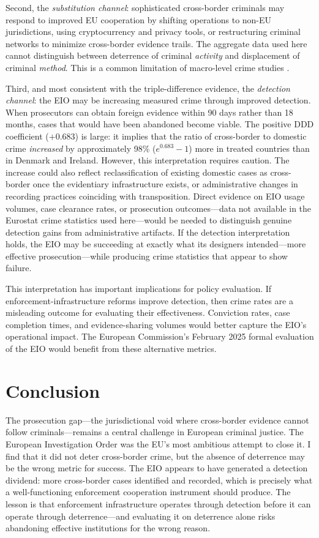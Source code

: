 \documentclass[12pt]{article}
\begin{document}
Second, the \textit{substitution channel}: sophisticated cross-border criminals may respond to improved EU cooperation by shifting operations to non-EU jurisdictions, using cryptocurrency and privacy tools, or restructuring criminal networks to minimize cross-border evidence trails. The aggregate data used here cannot distinguish between deterrence of criminal \textit{activity} and displacement of criminal \textit{method}. This is a common limitation of macro-level crime studies \citep{draca2011panic}.

Third, and most consistent with the triple-difference evidence, the \textit{detection channel}: the EIO may be increasing measured crime through improved detection. When prosecutors can obtain foreign evidence within 90 days rather than 18 months, cases that would have been abandoned become viable. The positive DDD coefficient ($+0.683$) is large: it implies that the ratio of cross-border to domestic crime \textit{increased} by approximately 98\% ($e^{0.683} - 1$) more in treated countries than in Denmark and Ireland. However, this interpretation requires caution. The increase could also reflect reclassification of existing domestic cases as cross-border once the evidentiary infrastructure exists, or administrative changes in recording practices coinciding with transposition. Direct evidence on EIO usage volumes, case clearance rates, or prosecution outcomes---data not available in the Eurostat crime statistics used here---would be needed to distinguish genuine detection gains from administrative artifacts. If the detection interpretation holds, the EIO may be succeeding at exactly what its designers intended---more effective prosecution---while producing crime statistics that appear to show failure.

This interpretation has important implications for policy evaluation. If enforcement-infrastructure reforms improve detection, then crime rates are a misleading outcome for evaluating their effectiveness. Conviction rates, case completion times, and evidence-sharing volumes would better capture the EIO's operational impact. The European Commission's February 2025 formal evaluation of the EIO would benefit from these alternative metrics.


\section{Conclusion}

The prosecution gap---the jurisdictional void where cross-border evidence cannot follow criminals---remains a central challenge in European criminal justice. The European Investigation Order was the EU's most ambitious attempt to close it. I find that it did not deter cross-border crime, but the absence of deterrence may be the wrong metric for success. The EIO appears to have generated a detection dividend: more cross-border cases identified and recorded, which is precisely what a well-functioning enforcement cooperation instrument should produce. The lesson is that enforcement infrastructure operates through detection before it can operate through deterrence---and evaluating it on deterrence alone risks abandoning effective institutions for the wrong reason.
\end{document}
